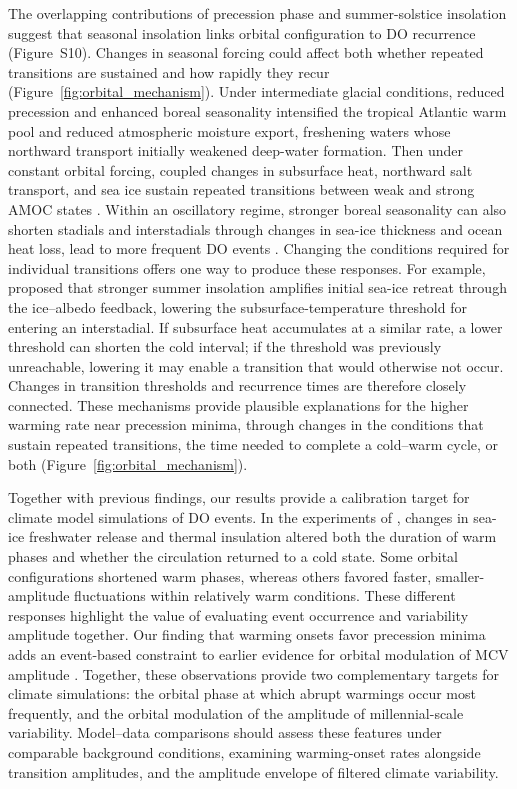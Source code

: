 \documentclass[11pt]{article}
\begin{document}
The overlapping contributions of precession phase and summer-solstice insolation suggest that seasonal insolation links orbital configuration to DO recurrence (Figure~S10). Changes in seasonal forcing could affect both whether repeated transitions are sustained and how rapidly they recur (Figure~\ref{fig:orbital_mechanism}). Under intermediate glacial conditions, reduced precession and enhanced boreal seasonality intensified the tropical Atlantic warm pool and reduced atmospheric moisture export, freshening waters whose northward transport initially weakened deep-water formation. Then under constant orbital forcing, coupled changes in subsurface heat, northward salt transport, and sea ice sustain repeated transitions between weak and strong AMOC states \citep{zhang2021direct}. Within an oscillatory regime, stronger boreal seasonality can also shorten stadials and interstadials through changes in sea-ice thickness and ocean heat loss, lead to more frequent DO events \citep{kuniyoshi2022effect}. Changing the conditions required for individual transitions offers one way to produce these responses. For example, \citet{fohlmeister2023role} proposed that stronger summer insolation amplifies initial sea-ice retreat through the ice--albedo feedback, lowering the subsurface-temperature threshold for entering an interstadial. If subsurface heat accumulates at a similar rate, a lower threshold can shorten the cold interval; if the threshold was previously unreachable, lowering it may enable a transition that would otherwise not occur. Changes in transition thresholds and recurrence times are therefore closely connected. These mechanisms provide plausible explanations for the higher warming rate near precession minima, through changes in the conditions that sustain repeated transitions, the time needed to complete a cold--warm cycle, or both (Figure~\ref{fig:orbital_mechanism}).

Together with previous findings, our results provide a calibration target for climate model simulations of DO events. In the experiments of \citet{snoll2025competing}, changes in sea-ice freshwater release and thermal insulation altered both the duration of warm phases and whether the circulation returned to a cold state. Some orbital configurations shortened warm phases, whereas others favored faster, smaller-amplitude fluctuations within relatively warm conditions. These different responses highlight the value of evaluating event occurrence and variability amplitude together. Our finding that warming onsets favor precession minima adds an event-based constraint to earlier evidence for orbital modulation of MCV amplitude \citep{sun2021persistent,hodell20231,thirumalai2020methane}. Together, these observations provide two complementary targets for climate simulations: the orbital phase at which abrupt warmings occur most frequently, and the orbital modulation of the amplitude of millennial-scale variability. Model–data comparisons should assess these features under comparable background conditions, examining warming-onset rates alongside transition amplitudes, and the amplitude envelope of filtered climate variability. 
\end{document}
